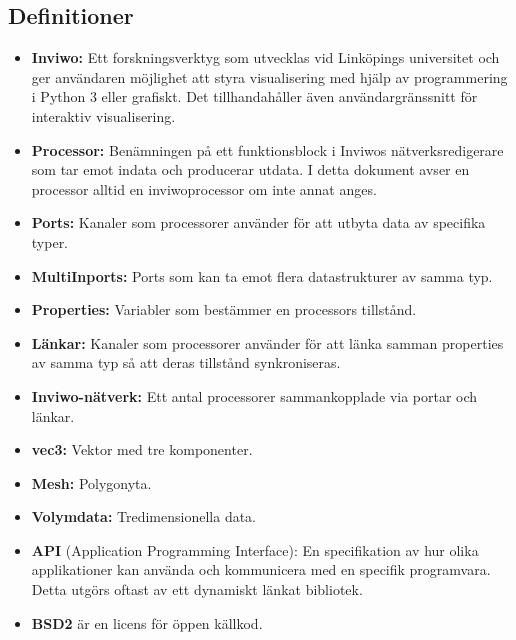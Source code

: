 \documentclass[a4paper,12pt]{article}
\begin{document}
\subsection{Definitioner}
\begin{itemize}
\setlength\itemsep{0em}
\item \textbf{Inviwo:} Ett forskningsverktyg som utvecklas vid Linköpings universitet och ger användaren möjlighet att styra visualisering med hjälp av programmering i Python 3 eller grafiskt. Det tillhandahåller även användargränssnitt för interaktiv visualisering.

\item \textbf{Processor:} Benämningen på ett funktionsblock i Inviwos nätverksredigerare som tar emot indata och producerar utdata. I detta dokument avser en processor alltid en inviwoprocessor om inte annat anges.

\item \textbf{Ports:} Kanaler som processorer använder för att utbyta data av specifika typer.

\item \textbf{MultiInports:} Ports som kan ta emot flera datastrukturer av samma typ.

\item \textbf{Properties:} Variabler som bestämmer en processors tillstånd.

\item \textbf{Länkar:} Kanaler som processorer använder för att länka samman properties av samma typ så att deras tillstånd synkroniseras.

\item \textbf{Inviwo-nätverk:} Ett antal processorer sammankopplade via portar och länkar.

\item \textbf{vec3:} Vektor med tre komponenter.

\item \textbf{Mesh:} Polygonyta.

\item \textbf{Volymdata:} Tredimensionella data.

\item \textbf{API} (Application Programming Interface): En specifikation av hur olika applikationer kan använda och kommunicera med en specifik programvara. Detta utgörs oftast av ett dynamiskt länkat bibliotek.
	\cite{API}

\item \textbf{BSD2} är en licens för öppen källkod.
	\cite{BSD2}


\end{itemize}
\end{document}
